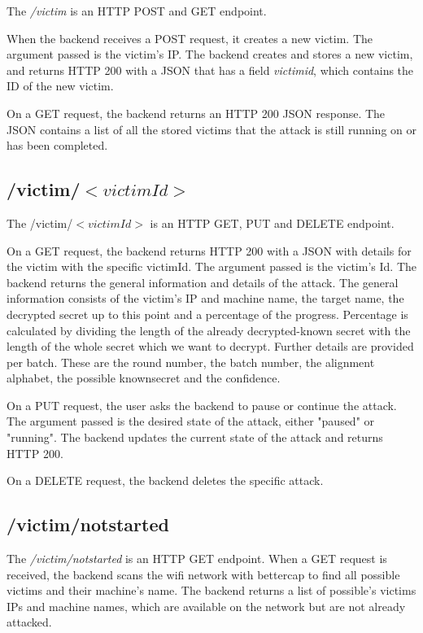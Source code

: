 The \textit{/victim} is an HTTP POST and GET endpoint. 

When the backend receives a POST request, it creates a new victim. 
The argument passed is the victim's IP. The backend 
creates and stores a new victim, and  returns HTTP 200 with a JSON that has a 
field \textit{victimid}, which contains the ID of the new victim.


On a GET request, the backend returns an HTTP 200 JSON response. 
The JSON contains a list of all the stored victims that the attack 
is still running on or has been completed.

\subsection{/victim/$ <victimId> $}

The /victim/$ <victimId> $ is an HTTP GET, PUT and DELETE endpoint.

On a GET request, the backend returns HTTP 200 with a JSON with details 
for the victim with the specific victimId. The argument passed is the 
victim's Id. The backend returns the general information and details of 
the attack. The general information consists of the victim's IP and 
machine name, the target name, the decrypted secret up to this point 
and a percentage of the progress. Percentage is calculated by dividing the
length of the already decrypted-known secret with the length of the whole secret which 
we want to decrypt. Further details are provided per  batch.
These are the round number, the batch number, the alignment alphabet, 
the possible knownsecret and the confidence.

On a PUT request, the user asks the backend to pause or continue the attack. 
The argument passed is the desired state of the attack, either "paused" 
or "running". The backend updates the current state of the attack and 
returns HTTP 200. 

On a DELETE request, the backend deletes the specific attack.

\subsection{/victim/notstarted}

The \textit{/victim/notstarted} is an HTTP GET endpoint. When a GET request 
is received, the backend scans the wifi network with bettercap to find all 
possible victims and their machine's name. The backend returns a list of 
possible's victims IPs and machine names, which are available on the network
but are not already attacked.


